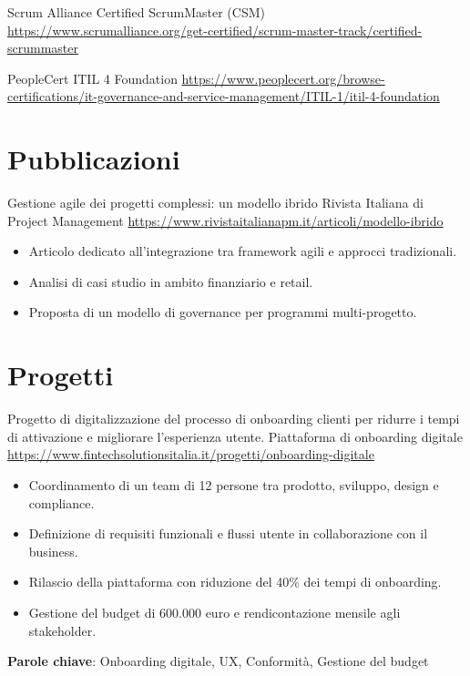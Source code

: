 \documentclass[a4paper, serif, 10pt]{moderncv}
\begin{document}
        {Scrum Alliance}
        {Certified ScrumMaster (CSM)}
        {\url{https://www.scrumalliance.org/get-certified/scrum-master-track/certified-scrummaster}}
        {}
        {}

        {PeopleCert}
        {ITIL 4 Foundation}
        {\url{https://www.peoplecert.org/browse-certifications/it-governance-and-service-management/ITIL-1/itil-4-foundation}}
        {}
        {}
\section{Pubblicazioni}

        {Gestione agile dei progetti complessi: un modello ibrido}
        {Rivista Italiana di Project Management}
        {\url{https://www.rivistaitalianapm.it/articoli/modello-ibrido}}
        {}
        {\begin{itemize}
\item Articolo dedicato all'integrazione tra framework agili e approcci tradizionali.
\item Analisi di casi studio in ambito finanziario e retail.
\item Proposta di un modello di governance per programmi multi-progetto.
\end{itemize}}
\section{Progetti}

        {Progetto di digitalizzazione del processo di onboarding clienti per ridurre i tempi di attivazione e migliorare l'esperienza utente.}
        {Piattaforma di onboarding digitale}
        {\url{https://www.fintechsolutionsitalia.it/progetti/onboarding-digitale}}
        {}
        {\begin{itemize}
\item Coordinamento di un team di 12 persone tra prodotto, sviluppo, design e compliance.
\item Definizione di requisiti funzionali e flussi utente in collaborazione con il business.
\item Rilascio della piattaforma con riduzione del 40\% dei tempi di onboarding.
\item Gestione del budget di 600.000 euro e rendicontazione mensile agli stakeholder.
\end{itemize}
\textbf{Parole chiave}: Onboarding digitale, UX, Conformità, Gestione del budget}
\end{document}
